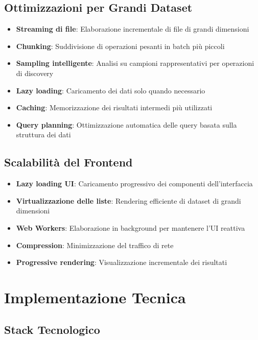 \documentclass[11pt,a4paper,twoside]{report}
\begin{document}
\section{Ottimizzazioni per Grandi Dataset}
\begin{itemize}
    \item \textbf{Streaming di file}: Elaborazione incrementale di file di grandi dimensioni
    \item \textbf{Chunking}: Suddivisione di operazioni pesanti in batch più piccoli
    \item \textbf{Sampling intelligente}: Analisi su campioni rappresentativi per operazioni di discovery
    \item \textbf{Lazy loading}: Caricamento dei dati solo quando necessario
    \item \textbf{Caching}: Memorizzazione dei risultati intermedi più utilizzati
    \item \textbf{Query planning}: Ottimizzazione automatica delle query basata sulla struttura dei dati
\end{itemize}

\section{Scalabilità del Frontend}
\begin{itemize}
    \item \textbf{Lazy loading UI}: Caricamento progressivo dei componenti dell'interfaccia
    \item \textbf{Virtualizzazione delle liste}: Rendering efficiente di dataset di grandi dimensioni
    \item \textbf{Web Workers}: Elaborazione in background per mantenere l'UI reattiva
    \item \textbf{Compression}: Minimizzazione del traffico di rete
    \item \textbf{Progressive rendering}: Visualizzazione incrementale dei risultati
\end{itemize}

\chapter{Implementazione Tecnica}

\section{Stack Tecnologico}
\end{document}
